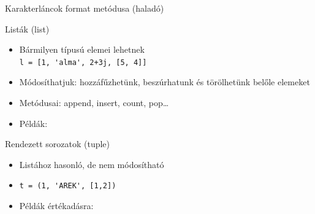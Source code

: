 \begin{frame}[fragile]
  {Karakterláncok format metódusa (haladó)}

  
\end{frame}

\begin{frame}[fragile]
  { Listák (list)}
  \begin{itemize}
    \item <+-| alert@+> Bármilyen típusú elemei lehetnek\\
   \verb!l = [1, 'alma', 2+3j, [5, 4]]!
    \item <+-> \alert{Módosíthatjuk}: hozzáfűzhetünk,
beszúrhatunk és törölhetünk belőle elemeket
    \item <+-| alert@+> Metódusai: append, insert, count, pop\dots
    \item <+-> Példák:
   
  \end{itemize}
\end{frame}

\begin{frame}[fragile]
  { Rendezett sorozatok (tuple)}
  \begin{itemize}
    \item <+-> Listához hasonló, de \alert{nem módosítható}
    \item <+-| alert@+> \verb!t = (1, 'AREK', [1,2])!
    \item <+-> Példák értékadásra:
   
  \end{itemize}
\end{frame}

